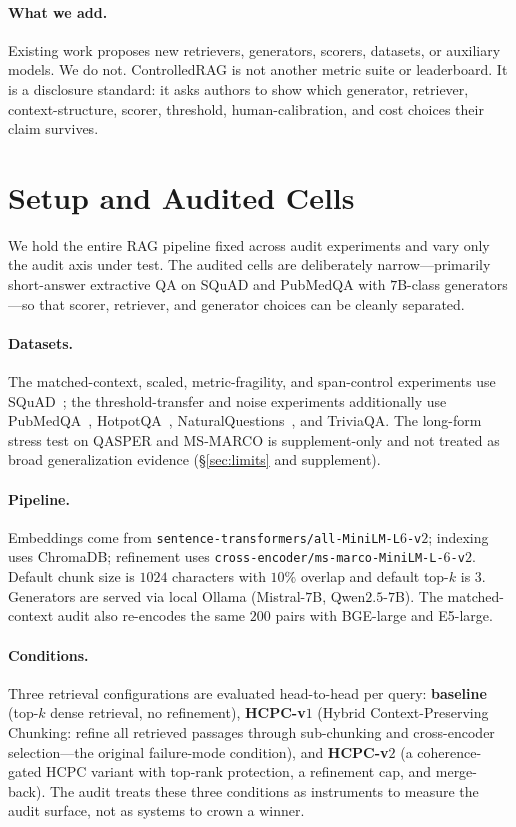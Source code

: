 \paragraph{What we add.} Existing work proposes new retrievers,
generators, scorers, datasets, or auxiliary models. We do not.
ControlledRAG is not another metric suite or leaderboard. It is a
disclosure standard: it asks authors to show which generator, retriever,
context-structure, scorer, threshold, human-calibration, and cost
choices their claim survives.

\section{Setup and Audited Cells}
\label{sec:setup}

We hold the entire RAG pipeline fixed across audit experiments and vary
only the audit axis under test. The audited cells are deliberately
narrow---primarily short-answer extractive QA on SQuAD and PubMedQA
with $7$B-class generators---so that scorer, retriever, and generator
choices can be cleanly separated.

\paragraph{Datasets.} The matched-context, scaled, metric-fragility,
and span-control experiments use SQuAD~\citep{rajpurkar2016squad}; the
threshold-transfer and noise experiments additionally use
PubMedQA~\citep{jin2019pubmedqa}, HotpotQA~\citep{yang2018hotpotqa},
NaturalQuestions~\citep{kwiatkowski2019nq}, and TriviaQA. The long-form
stress test on QASPER and MS-MARCO is supplement-only and not treated
as broad generalization evidence (\S\ref{sec:limits} and supplement).

\paragraph{Pipeline.} Embeddings come from
\texttt{sentence-transformers/all-MiniLM-L$6$-v$2$}; indexing uses
ChromaDB; refinement uses
\texttt{cross-encoder/ms-marco-MiniLM-L-$6$-v$2$}. Default chunk size is
$1024$ characters with $10\%$ overlap and default top-$k$ is $3$.
Generators are served via local Ollama (Mistral-$7$B,
Qwen$2.5$-$7$B). The matched-context audit also re-encodes the same
$200$ pairs with BGE-large and E5-large.

\paragraph{Conditions.} Three retrieval configurations are evaluated
head-to-head per query: \textbf{baseline} (top-$k$ dense retrieval, no
refinement), \textbf{HCPC-v$1$} (Hybrid Context-Preserving Chunking:
refine all retrieved passages through sub-chunking and cross-encoder
selection---the original failure-mode condition), and
\textbf{HCPC-v$2$} (a coherence-gated HCPC variant with top-rank
protection, a refinement cap, and merge-back). The audit treats these
three conditions as instruments to measure the audit surface, not as
systems to crown a winner.

